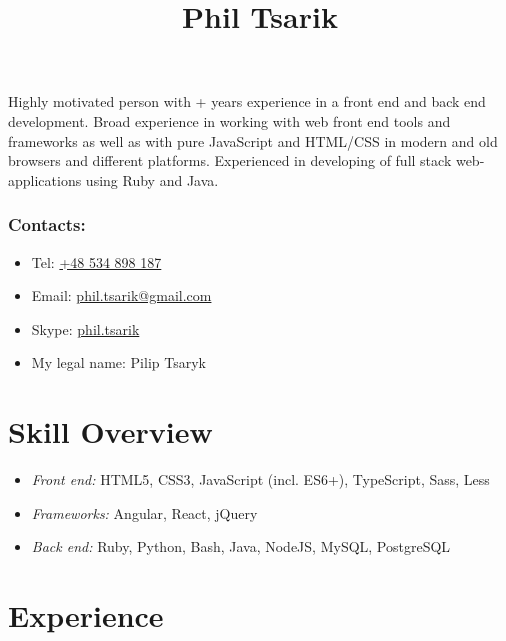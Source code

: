 \documentclass[a4paper, 12pt]{article}
\title{Phil Tsarik}
\author{}
\date{}
\newcommand{\itemlabel}[1]{
    \textit{#1:}}
\newcommand{\defvalue}[2]{\ifx#1\empty#2\else#1\fi}
\newcommand{\yearsexp}{%
    \FPeval{\result}{clip(\the\year - 2011)}%
    \defvalue{\result}{5+}}
\begin{document}
\maketitle

Highly motivated person with \yearsexp{} years experience in a front end and back end development.
Broad experience in working with web front end tools and frameworks as well as with pure JavaScript and HTML/CSS in modern and old browsers and different platforms.
Experienced in developing of full stack web-applications using Ruby and Java.

\subsubsection*{Contacts:}
\begin{itemize}
    \item Tel: \href{tel:+48534898187}{+48 534 898 187}
    \item Email: \href{mailto:phil.tsarik@gmail.com}{phil.tsarik@gmail.com}
    \item Skype: \href{callto:phil.tsarik}{phil.tsarik}
    \item My legal name: Pilip Tsaryk
\end{itemize}


\section*{Skill Overview}

    \begin{itemize}
        \item \itemlabel{Front end} HTML5, CSS3, JavaScript (incl. ES6+), TypeScript, Sass, Less
        \item \itemlabel{Frameworks} Angular, React, jQuery
        \item \itemlabel{Back end} Ruby, Python, Bash, Java, NodeJS, MySQL, PostgreSQL
    \end{itemize}


\section*{Experience}
\end{document}
